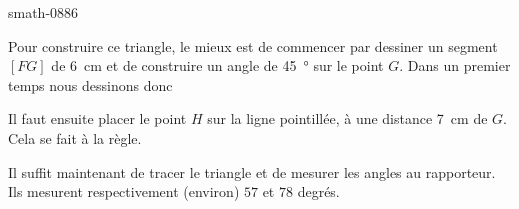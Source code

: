 
\begin{corrige}{smath-0886}

    Pour construire ce triangle, le mieux est de commencer par dessiner un segment \( [FG]\) de \SI{6}{\centi\meter} et de construire un angle de \SI{45}{\degree} sur le point \( G\). Dans un premier temps nous dessinons donc

\begin{center}
   
\end{center}
Il faut ensuite placer le point \( H\) sur la ligne pointillée, à une distance \SI{7}{\centi\meter} de \( G\). Cela se fait à la règle.
\begin{center}
   
\end{center}
Il suffit maintenant de tracer le triangle et de mesurer les angles au rapporteur. Ils mesurent respectivement (environ) \( 57\) et \( 78\) degrés.
\begin{center}
   
\end{center}

\end{corrige}
